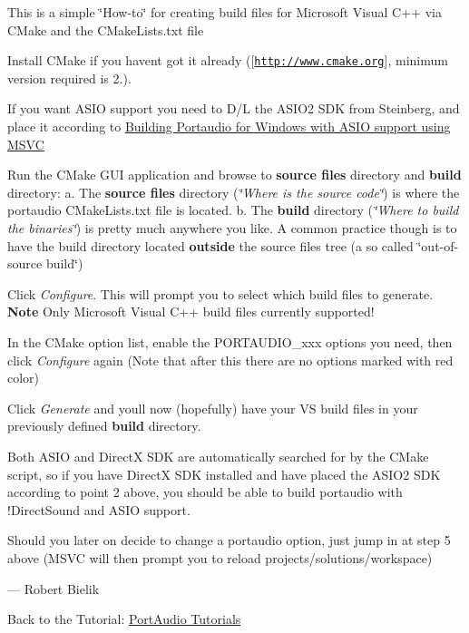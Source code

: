 This is a simple \char`\"{}\+How-\/to\char`\"{} for creating build files for Microsoft Visual C++ via C\+Make and the C\+Make\+Lists.\+txt file


\begin{DoxyEnumerate}
\item Install C\+Make if you haven\textquotesingle{}t got it already (\mbox{[}\href{http://www.cmake.org}{\tt http\+://www.\+cmake.\+org}\mbox{]}, minimum version required is 2.).
\item If you want A\+S\+IO support you need to D/L the A\+S\+I\+O2 S\+DK from Steinberg, and place it according to \hyperlink{compile_windows_asio_msvc}{Building Portaudio for Windows with A\+S\+IO support using M\+S\+VC}
\item Run the C\+Make G\+UI application and browse to {\bfseries source files} directory and {\bfseries build} directory\+: a. The {\bfseries source files} directory ({\itshape \char`\"{}\+Where is the source code\char`\"{}}) is where the portaudio C\+Make\+Lists.\+txt file is located. b. The {\bfseries build} directory ({\itshape \char`\"{}\+Where to build the binaries\char`\"{}}) is pretty much anywhere you like. A common practice though is to have the build directory located {\bfseries outside} the source files tree (a so called \char`\"{}out-\/of-\/source build\char`\"{})
\item Click {\itshape Configure}. This will prompt you to select which build files to generate. {\bfseries Note} Only Microsoft Visual C++ build files currently supported!
\item In the C\+Make option list, enable the P\+O\+R\+T\+A\+U\+D\+I\+O\+\_\+xxx options you need, then click {\itshape Configure} again (Note that after this there are no options marked with red color)
\item Click {\itshape Generate} and you\textquotesingle{}ll now (hopefully) have your VS build files in your previously defined {\bfseries build} directory.
\end{DoxyEnumerate}

Both A\+S\+IO and DirectX S\+DK are automatically searched for by the C\+Make script, so if you have DirectX S\+DK installed and have placed the A\+S\+I\+O2 S\+DK according to point 2 above, you should be able to build portaudio with !\+Direct\+Sound and A\+S\+IO support.

Should you later on decide to change a portaudio option, just jump in at step 5 above (M\+S\+VC will then prompt you to reload projects/solutions/workspace)

--- Robert Bielik

Back to the Tutorial\+: \hyperlink{tutorial_start}{Port\+Audio Tutorials} 